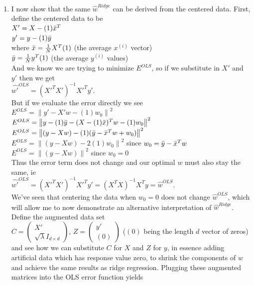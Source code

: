 \documentclass[1pt]{article}
\newcommand{\norm}[1]{\left\lVert#1\right\rVert}
\begin{document}
\begin{enumerate}[label=(\alph*)]
\item I now show that the same $\hat{w}^{Ridge}$ can be derived from the centered data. First, define the centered data to be \\
$X' = X - (1)\Bar{x}^T$\\
$y' = y - (1)\Bar{y}$\\
where
$\Bar{x} = \frac{1}{N}X^T(1)$ (the average $x^{(i)}$ vector) \\
$\Bar{y} = \frac{1}{N}y^T(1)$ (the average $y^{(i)}$ values) \\
And we know we are trying to minimize $E^{OLS}$, so if we substitute in $X'$ and $y'$ then we get \\
$\hat{w'}^{OLS} = (X'^TX')^{-1}X'^Ty'$. \\
But if we evaluate the error directly we see\\
$E^{OLS} =  \norm{y' - X'w - (1)w_0}^2$\\
$E^{OLS} =  \norm{y - (1)\Bar{y} - (X - (1)\Bar{x})^Tw - (1)w_0}^2$\\
$E^{OLS} =  \norm{(y - Xw) - (1)(\Bar{y} - \Bar{x}^Tw + w_0)}^2$\\
$E^{OLS} =  \norm{(y - Xw) - 2(1)w_0}^2$  since $w_0 = \Bar{y} - \Bar{x}^Tw$\\
$E^{OLS} =  \norm{(y - Xw)}^2$  since $w_0 = 0$\\
Thus the error term does not change and our optimal $w$ must also stay the same, ie \\
$\hat{w'}^{OLS} = (X'^TX')^{-1}X'^Ty' = (X^TX)^{-1}X^Ty = \hat{w}^{OLS}$. \\
We've seen that centering the data when $w_0 = 0$ does not change $\hat{w}^{OLS}$, which will allow me to now demonstrate an alternative interpretation of $\hat{w}^{Ridge}$. Define the augmented data set \\
$C = \begin{pmatrix}X'\\ \sqrt{\lambda} I_{d \times d} \end{pmatrix}$,
$Z = \begin{pmatrix}y'\\ (0)  \end{pmatrix}$ ($(0)$ being the length $d$ vector of zeros)\\
and see how we can substitute $C$ for $X$ and $Z$ for $y$, in essence adding artificial data which has response value zero, to shrink the components of $w$ and achieve the same results as ridge regression. Plugging these augmented matrices into the OLS error function yields  \\

\end{enumerate}
\end{document}

